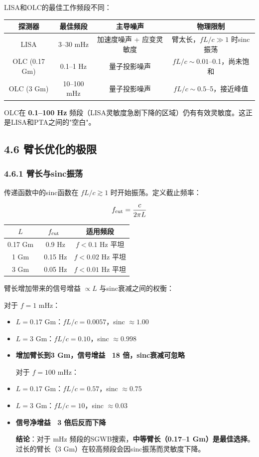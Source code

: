 \documentclass[12pt,a4paper]{article}
\begin{document}
LISA和OLC的最佳工作频段不同：

\begin{tabular}{|c|c|c|c|}
\hline
探测器 & 最佳频段 & 主导噪声 & 物理限制 \\
\hline
LISA & 3–30 mHz & 加速度噪声 + 应变灵敏度 & 臂太长，$fL/c \gg 1$ 时sinc振荡 \\
OLC (0.17 Gm) & 0.1–1 Hz & 量子投影噪声 & $fL/c \sim 0.01$–0.1，尚未饱和 \\
OLC (3 Gm) & 10–100 mHz & 量子投影噪声 & $fL/c \sim 0.5$–5，接近峰值 \\
\hline
\end{tabular}


OLC在 \textbf{0.1–100 Hz} 频段（LISA灵敏度急剧下降的区域）仍有有效灵敏度。这正是LISA和PTA之间的"空白"。

\subsection{4.6 臂长优化的极限}


\subsubsection{4.6.1 臂长与sinc振荡}


传递函数中的sinc函数在 $fL/c \gtrsim 1$ 时开始振荡。定义截止频率：

$$f_{\rm cut} = \frac{c}{2\pi L}$$

\begin{tabular}{|c|c|c|}
\hline
$L$ & $f_{\rm cut}$ & 适用频段 \\
\hline
0.17 Gm & ~0.9 Hz & $f < 0.1$ Hz 平坦 \\
1 Gm & ~0.15 Hz & $f < 0.02$ Hz 平坦 \\
3 Gm & ~0.05 Hz & $f < 0.01$ Hz 平坦 \\
\hline
\end{tabular}


臂长增加带来的信号增益 $\propto L$ 与sinc衰减之间的权衡：

对于 $f = 1$ mHz：
\begin{itemize}
  \item $L = 0.17$ Gm：$fL/c = 0.0057$，sinc $\approx 1.00$
  \item $L = 3$ Gm：$fL/c = 0.10$，sinc $\approx 0.998$
  \item \textbf{增加臂长到3 Gm，信号增益 ~18 倍，sinc衰减可忽略}

对于 $f = 100$ mHz：
  \item $L = 0.17$ Gm：$fL/c = 0.57$，sinc $\approx 0.75$
  \item $L = 3$ Gm：$fL/c = 10$，sinc $\approx 0.03$
  \item \textbf{信号净增益 ~3 倍后反而下降}

\textbf{结论}：对于 mHz 频段的SGWB搜索，\textbf{中等臂长（0.17–1 Gm）是最佳选择}。过长的臂长（3 Gm）在较高频段会因sinc振荡而灵敏度下降。

\end{itemize}
\end{document}
